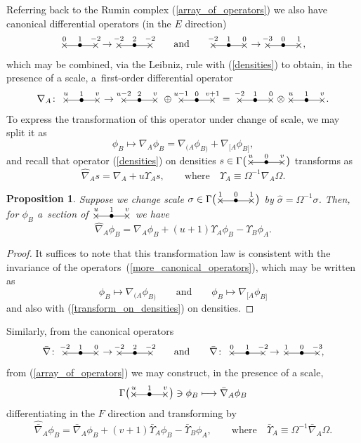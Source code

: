 \documentclass[10pt,a4paper]{amsart}
\numberwithin{equation}{section}
\newtheorem{prop}[Theorem]{Proposition}
 { \theoremstyle{definition}
\newtheorem{Definition}[Theorem]{Definition}
\newtheorem{Note}[Theorem]{Note}
\newtheorem{Example}[Theorem]{Example}
\newtheorem{Remark}[Theorem]{Remark} }
\newcommand{\xox}[3]{\begin{picture}(40,11)
\put(4,1.5){\makebox(0,0){$\times$}}
\put(20,1.5){\makebox(0,0){$\bullet$}}
\put(36,1.5){\makebox(0,0){$\times$}}
\put(4,1.5){\line(1,0){32}}
\put(4,8){\makebox(0,0){$\scriptstyle #1$}}
\put(20,8){\makebox(0,0){$\scriptstyle #2$}}
\put(36,8){\makebox(0,0){$\scriptstyle #3$}}
\end{picture}}
\begin{document}
Referring back to the Rumin complex (\ref{array_of_operators}) we also
have canonical differential operators (in the $E$ direction)
\begin{equation}\label{more_canonical_operators}
\xox{0}{1}{-2} \to \xox{-2}{2}{-2}\qquad\mbox{and}\qquad
\xox{-2}{1}{0} \to \xox{-3}{0}{1},
\end{equation}
which may be combined, via the Leibniz, rule with (\ref{densities}) to obtain,
in the presence of a scale, a~first-order differential operator
\[
\nabla_A\colon \ \xox{u}{1}{v}\to\ \xox{u-2}{2}{v}\;\oplus\ \xox{u-1}{0}{v+1}
\ =\;\xox{-2}{1}{0}\otimes\xox{u}{1}{v}.\]
To express the transformation of this operator under change of scale,
we may split it as
\[\phi_B\mapsto\nabla_A\phi_B=\nabla_{(A}\phi_{B)}+\nabla_{[A}\phi_{B]},\]
and recall that operator (\ref{densities}) on densities
$s\in\Gamma\big(\xox{u}{0}{v}\big)$ transforms as
\begin{equation}\label{transform_on_densities}
\widehat\nabla_A s=\nabla_A+u\Upsilon_A s,\qquad\mbox{where}\quad
\Upsilon_A\equiv\Omega^{-1}\nabla_A\Omega.\end{equation}

\begin{prop} Suppose we change scale $\sigma\in\Gamma\big(\xox{1}{0}{1}\big)$ by
$\widehat\sigma=\Omega^{-1}\sigma$. Then, for $\phi_B$ a~section of
$\xox{u}{1}{v}$ we have
\begin{equation}\label{full_transformation_law}\widehat\nabla_A\phi_B
=\nabla_A\phi_B+(u+1)\Upsilon_A\phi_B-\Upsilon_B\phi_A.\end{equation}
\end{prop}
\begin{proof}
It suffices to note that this transformation law is consistent with the
invariance of the operators~(\ref{more_canonical_operators}), which may be
written as
\[\phi_B\longmapsto\nabla_{(A}\phi_{B)}\qquad\mbox{and}\qquad
\phi_B\longmapsto\nabla_{[A}\phi_{B]}\]
and also with (\ref{transform_on_densities}) on densities.
\end{proof}

Similarly, from the canonical operators
\[\bar\nabla\colon \ \xox{-2}{1}{0}\to\xox{-2}{2}{-2}\qquad\mbox{and}\qquad
\bar\nabla\colon \ \xox{0}{1}{-2}\to\xox{1}{0}{-3},\]
from (\ref{array_of_operators}) we may construct, in the presence of a scale,
\[\Gamma\big(\xox{u}{1}{v}\big)\ni\phi_B\longmapsto\bar\nabla_A\phi_B\]
differentiating in the $F$ direction and transforming by
\begin{equation}\label{full_barred_transformation_law}
\widehat{\bar\nabla}_A\phi_B=\bar\nabla_A\phi_B
+(v+1)\bar\Upsilon_A\phi_B
-\bar\Upsilon_B\phi_A,
\qquad\mbox{where}\quad \bar\Upsilon_A\equiv\Omega^{-1}\bar\nabla_A\Omega.
\end{equation}
\end{document}
